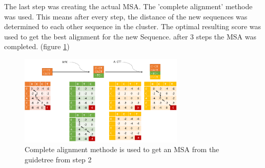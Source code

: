 \documentclass[%
   10pt,              %
   nenglish,           %
   a4paper,           %
   DIV11,             %
]{scrartcl}%
\begin{document}
The last step was creating the actual MSA. The 'complete alignment' methode was used. This means after every step, the distance of the new sequences was determined to each other sequence in the cluster. The optimal resulting score was used to get the best alignment for the new Sequence. after 3 steps the MSA was completed. (figure \ref{completealign})
\begin{figure}[ht]
        \centering
	\includegraphics[width=0.7\textwidth]{Img/Exercise2-CompleteAlignment.png}
	\caption{ Complete alignment methode is used to get an MSA from the guidetree from step 2	}
	\label{completealign}
\end{figure}
\end{document}
